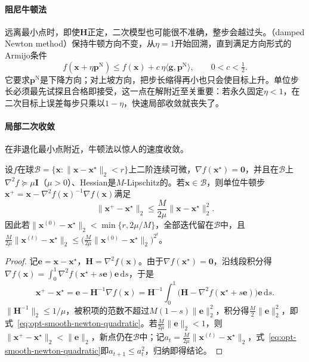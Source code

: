 \paragraph{阻尼牛顿法}
远离最小点时，即使$\bm H$正定，二次模型也可能很不准确，整步会越过头。（damped Newton method）保持牛顿方向不变，从$\eta=1$开始回溯，直到满足方向形式的Armijo条件
\[
  f(\bm x+\eta\bm p^{\mathrm N})\leq f(\bm x)+c\,\eta\langle\bm g,\bm p^{\mathrm N}\rangle,\qquad 0<c<\tfrac12 .
\]
它要求$\bm p^{\mathrm N}$是下降方向；对上坡方向，把步长缩得再小也只会使目标上升。单位步长必须最先试探且合格即接受，这一点在解附近至关重要：若永久固定$\eta<1$，在二次目标上误差每步只乘以$1-\eta$，快速局部收敛就丧失了。

\paragraph{局部二次收敛}
在非退化最小点附近，牛顿法以惊人的速度收敛。

\begin{theorem}[牛顿法的局部二次收敛]
\label{thm:opt-smooth-newton-local}
设$f$在球$\mathcal B=\{\bm x:\lVert\bm x-\bm x^\star\rVert_2<r\}$上二阶连续可微，$\nabla f(\bm x^\star)=\bm0$，并且在$\mathcal B$上$\nabla^2f\succeq\mu\bm I$（$\mu>0$）、Hessian是$M$-Lipschitz的。若$\bm x\in\mathcal B$，则单位牛顿步$\bm x^+=\bm x-\nabla^2f(\bm x)^{-1}\nabla f(\bm x)$满足
\begin{equation}
\label{eq:opt-smooth-newton-quadratic}
  \lVert\bm x^+-\bm x^\star\rVert_2\leq\frac{M}{2\mu}\lVert\bm x-\bm x^\star\rVert_2^2 .
\end{equation}
因此若$\lVert\bm x^{(0)}-\bm x^\star\rVert_2<\min\{r,2\mu/M\}$，全部迭代留在$\mathcal B$中，且$\tfrac{M}{2\mu}\lVert\bm x^{(t)}-\bm x^\star\rVert_2\leq\bigl(\tfrac{M}{2\mu}\lVert\bm x^{(0)}-\bm x^\star\rVert_2\bigr)^{2^t}$。
\end{theorem}

\begin{proof}
记$\bm e=\bm x-\bm x^\star$，$\bm H=\nabla^2f(\bm x)$。由于$\nabla f(\bm x^\star)=\bm0$，沿线段积分得$\nabla f(\bm x)=\int_0^1\nabla^2f(\bm x^\star+s\bm e)\bm e\,\mathrm ds$，于是
\[
  \bm x^+-\bm x^\star=\bm e-\bm H^{-1}\nabla f(\bm x)=\bm H^{-1}\int_0^1\bigl(\bm H-\nabla^2f(\bm x^\star+s\bm e)\bigr)\bm e\,\mathrm ds .
\]
$\lVert\bm H^{-1}\rVert_2\leq1/\mu$，被积项的范数不超过$M(1-s)\lVert\bm e\rVert_2^2$，积分得$\tfrac M2\lVert\bm e\rVert_2^2$，即式~\eqref{eq:opt-smooth-newton-quadratic}。若$\tfrac M{2\mu}\lVert\bm e\rVert_2<1$，则$\lVert\bm x^+-\bm x^\star\rVert_2<\lVert\bm e\rVert_2$，新点仍在$\mathcal B$中；记$a_t=\tfrac M{2\mu}\lVert\bm x^{(t)}-\bm x^\star\rVert_2$，式~\eqref{eq:opt-smooth-newton-quadratic}即$a_{t+1}\leq a_t^2$，归纳即得结论。
\end{proof}

